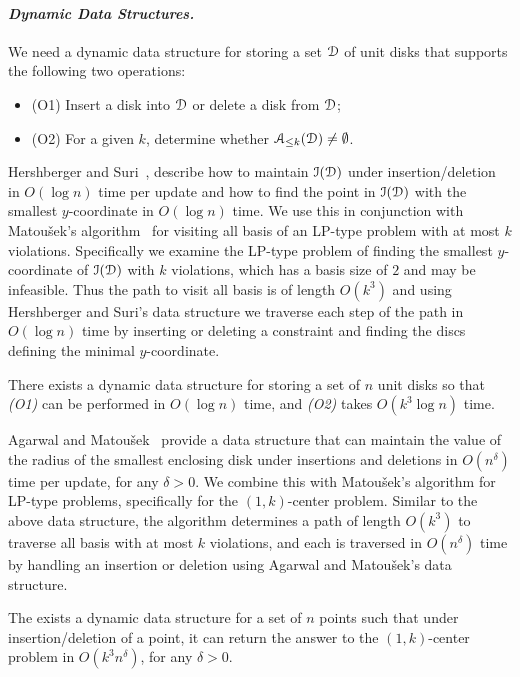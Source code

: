 \documentclass[11pt]{myclass}
\newcommand{\EuD}{\ensuremath{\EuScript{D}}}
\newcommand{\EuA}{\ensuremath{\EuScript{A}}}
\newcommand{\EuI}{\ensuremath{\EuScript{I}}}
\begin{document}
\paragraph{\textbf{\emph{Dynamic Data Structures.}}} 
We need a dynamic data structure for storing a set $\EuD$ of unit disks that supports the following two operations:
\begin{itemize}
\item{(O1)} Insert a disk into $\EuD$ or delete a disk from $\EuD$;
\item{(O2)} For a given $k$, determine whether $\EuA_{\leq k}(\EuD) \neq \emptyset$.
\end{itemize}

Hershberger and Suri~\cite{HS91}, describe how to maintain $\EuI(\EuD)$ under insertion/deletion in $O(\log n)$ time per update and how to find the point in $\EuI(\EuD)$ with the smallest $y$-coordinate in $O(\log n)$ time.
We use this in conjunction with Matou\v{s}ek's algorithm~\cite{Mat95} for visiting all basis of an LP-type problem with at most $k$ violations.   Specifically we examine the LP-type problem of finding the smallest $y$-coordinate of $\EuI(\EuD)$ with $k$ violations, which has a basis size of $2$ and may be infeasible.  Thus the path to visit all basis is of length $O(k^3)$ and using Hershberger and Suri's data structure we traverse each step of the path in $O(\log n)$ time by inserting or deleting a constraint and finding the discs defining the minimal $y$-coordinate.  

\begin{lemma}
There exists a dynamic data structure for storing a set of $n$ unit disks so that \emph{(O1)} can be performed in $O(\log n)$ time, and \emph{(O2)} takes $O(k^3 \log n)$ time.  
\label{lem:dynD}
\end{lemma}


Agarwal and Matou\v{s}ek~\cite{AM95} provide a data structure that can maintain the value of the radius of the smallest enclosing disk under insertions and deletions in $O(n^{\delta})$ time per update, for any $\delta>0$.  
We combine this with Matou\v{s}ek's algorithm for LP-type problems, specifically for the $(1,k)$-center problem.  Similar to the above data structure, the algorithm determines a path of length $O(k^3)$ to traverse all basis with at most $k$ violations, and each is traversed in $O(n^{\delta})$ time by handling an insertion or deletion using Agarwal and Matou\v{s}ek's data structure.  

\begin{lemma}
The exists a dynamic data structure for a set of $n$ points such that under insertion/deletion of a point, it can return the answer to the $(1,k)$-center problem in $O(k^3 n^\delta)$, for any $\delta>0$.  
\label{lem:dynC}
\end{lemma}
\end{document}
